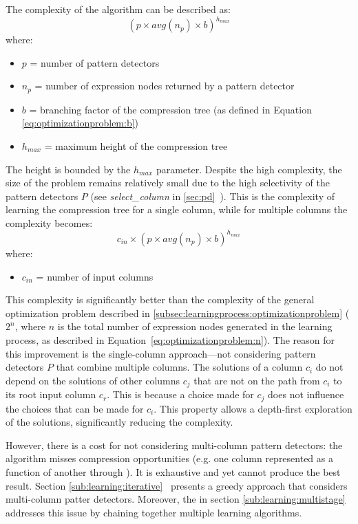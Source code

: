 The complexity of the algorithm can be described as:
\begin{equation}
\label{eq:learning:recursiveexhaustive:single}
    (p \times \mathit{avg}(n_{p}) \times b) ^ {h_{max}}
\end{equation}
where:
\begin{itemize}
    \item[] \(p\) = number of pattern detectors
    \item[] \(n_{p}\) = number of expression nodes returned by a pattern detector
    \item[] \(b\) = branching factor of the compression tree (as defined in Equation \ref{eq:optimizationproblem:b})
    \item[] \(h_{max}\) = maximum height of the compression tree
\end{itemize}
The height is bounded by the \(h_{max}\) parameter. Despite the high complexity, the size of the problem remains relatively small due to the high selectivity of the pattern detectors \(P\) (see \textit{select\_column} in \ref{sec:pd}~). This is the complexity of learning the compression tree for a single column, while for multiple columns the complexity becomes:
\begin{equation}
\label{eq:learning:recursiveexhaustive:multi}
    c_{in} \times (p \times \mathit{avg}(n_{p}) \times b) ^ {h_{max}}
\end{equation}
where:
\begin{itemize}
    \item[] \(c_{in}\) = number of input columns
\end{itemize}

This complexity is significantly better than the complexity of the general optimization problem described in \ref{subsec:learningprocess:optimizationproblem} (\(2^n\), where \(n\) is the total number of expression nodes generated in the learning process, as described in Equation~\ref{eq:optimizationproblem:n}). The reason for this improvement is the single-column approach---not considering pattern detectors \(P\) that combine multiple columns. The solutions of a column \(c_{i}\) do not depend on the solutions of other columns \(c_{j}\) that are not on the path from \(c_{i}\) to its root input column \(c_{r}\). This is because a choice made for \(c_{j}\) does not influence the choices that can be made for \(c_{i}\).
This property allows a depth-first exploration of the solutions, significantly reducing the complexity.

However, there is a cost for not considering multi-column pattern detectors: the algorithm misses compression opportunities (e.g. one column represented as a function of another through ). It is exhaustive and yet cannot produce the best result. Section \ref{sub:learning:iterative}~ presents a greedy approach that considers multi-column patter detectors. Moreover, the  in section \ref{sub:learning:multistage} addresses this issue by chaining together multiple learning algorithms.

